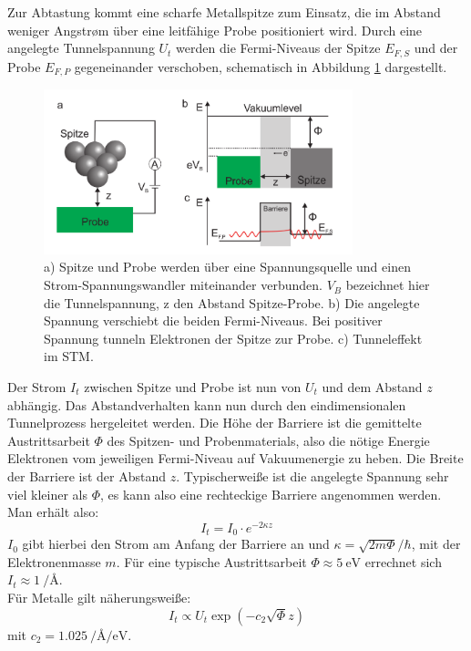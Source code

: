 Zur Abtastung kommt eine scharfe Metallspitze zum Einsatz, die im Abstand weniger
Angstrøm über eine leitfähige Probe positioniert wird. Durch eine angelegte 
Tunnelspannung $U_t$ werden die Fermi-Niveaus der Spitze $E_{F,S}$ und der Probe
$E_{F,P}$ gegeneinander verschoben, schematisch in Abbildung \ref{tunnelstm} 
dargestellt.
\begin{figure}
    \centering
    \includegraphics[width=0.8\textwidth]{Abb/tunnel_stm.png}
    \caption{a) Spitze und Probe werden über eine Spannungsquelle und einen 
                Strom-Spannungswandler miteinander verbunden. $V_B$ bezeichnet
                hier die Tunnelspannung, z den Abstand Spitze-Probe.
             b) Die angelegte Spannung verschiebt die beiden Fermi-Niveaus. Bei 
                positiver Spannung tunneln Elektronen der Spitze zur Probe.
             c) Tunneleffekt im STM.
             \cite{hofmann}}
    \label{tunnelstm}
\end{figure}
Der Strom $I_t$ zwischen Spitze und Probe ist nun von $U_t$ und dem Abstand $z$ 
abhängig. Das Abstandverhalten kann nun durch den eindimensionalen Tunnelprozess
hergeleitet werden. Die Höhe der Barriere ist die gemittelte Austrittsarbeit $\Phi$
des Spitzen- und Probenmaterials, also die nötige Energie Elektronen vom jeweiligen
Fermi-Niveau auf Vakuumenergie zu heben. Die Breite der Barriere ist der Abstand $z$.
Typischerweiße ist die angelegte Spannung sehr viel kleiner als $\Phi$, es kann also
eine rechteckige Barriere angenommen werden. Man erhält also:
\[
    I_t = I_0 \cdot e^{-2\kappa z}    
\]
$I_0$ gibt hierbei den Strom am Anfang der Barriere 
an und $\kappa = \sqrt{2m \Phi}/ \hbar$, mit
der Elektronenmasse $m$. Für eine typische Austrittsarbeit $\Phi \approx \SI{5}{\eV}$
errechnet sich $I_t \approx \SI{1}{\per \angstrom}$.\\
Für Metalle gilt näherungsweiße:
\[
    I_t \propto U_t \exp(-c_2 \sqrt{\Phi} z)
\]
mit $c_2 = \SI{1,025}{\per\angstrom\per\eV}$.
\cite{schwabl,hofmann}

